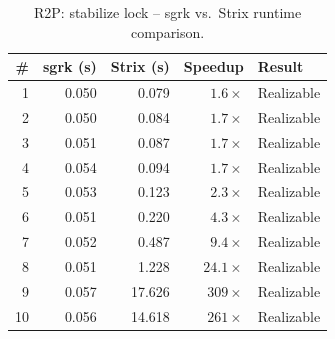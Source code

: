 \begin{table}[htbp]
\centering
\caption{R2P: stabilize lock -- sgrk vs.\ Strix runtime comparison.}
\label{tab:R2P_stabilize_lock}
\begin{tabular}{r r r r l}
\toprule
\# & sgrk (s) & Strix (s) & Speedup & Result \\
\midrule
1 & 0.050 & 0.079 & $1.6\times$ & Realizable \\
2 & 0.050 & 0.084 & $1.7\times$ & Realizable \\
3 & 0.051 & 0.087 & $1.7\times$ & Realizable \\
4 & 0.054 & 0.094 & $1.7\times$ & Realizable \\
5 & 0.053 & 0.123 & $2.3\times$ & Realizable \\
6 & 0.051 & 0.220 & $4.3\times$ & Realizable \\
7 & 0.052 & 0.487 & $9.4\times$ & Realizable \\
8 & 0.051 & 1.228 & $24.1\times$ & Realizable \\
9 & 0.057 & 17.626 & $309\times$ & Realizable \\
10 & 0.056 & 14.618 & $261\times$ & Realizable \\
\bottomrule
\end{tabular}
\end{table}
